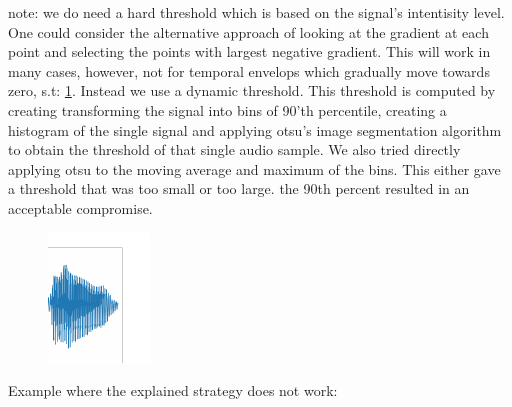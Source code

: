 \begin{appendices}
	
	
	note: we do need a hard threshold which is based on the signal's intentisity level. One could consider the alternative approach of looking at the gradient at each point and selecting the points with largest negative gradient. This will work in many cases, however, not for temporal envelops which gradually move towards zero, s.t: \ref{fig:example where gardient doesnt work}. Instead we use a dynamic threshold. This threshold is computed by creating transforming the signal into bins of 90'th percentile, creating a histogram of the single signal and applying otsu's image segmentation algorithm to obtain the threshold of that single audio sample.
	We also tried directly applying otsu to the moving average and maximum of the bins. This either gave a threshold that was too small or too large. the 90th percent resulted in an acceptable compromise.
	
	
	\begin{figure}[h]
		\centering
		\includegraphics[width=0.7\linewidth]{screenshot011}
		\caption{}
		\label{fig:example where gardient doesnt work}
	\end{figure}
	
	
	
	Example where the explained strategy does not work: %
	

\end{appendices}
